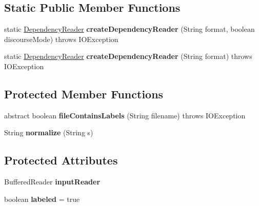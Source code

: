 \subsection*{Static Public Member Functions}
\begin{DoxyCompactItemize}
\item 
\hypertarget{classmstparser_1_1io_1_1DependencyReader_a1fcb7fe3a6edc5ae299700488477d660}{
static \hyperlink{classmstparser_1_1io_1_1DependencyReader}{DependencyReader} {\bfseries createDependencyReader} (String format, boolean discourseMode)  throws IOException }
\label{classmstparser_1_1io_1_1DependencyReader_a1fcb7fe3a6edc5ae299700488477d660}

\item 
\hypertarget{classmstparser_1_1io_1_1DependencyReader_ab5c02feda68bf1c768b4b97e42097873}{
static \hyperlink{classmstparser_1_1io_1_1DependencyReader}{DependencyReader} {\bfseries createDependencyReader} (String format)  throws IOException }
\label{classmstparser_1_1io_1_1DependencyReader_ab5c02feda68bf1c768b4b97e42097873}

\end{DoxyCompactItemize}
\subsection*{Protected Member Functions}
\begin{DoxyCompactItemize}
\item 
\hypertarget{classmstparser_1_1io_1_1DependencyReader_a948c0deb5940f2e25e7a3b2097cd4546}{
abstract boolean {\bfseries fileContainsLabels} (String filename)  throws IOException}
\label{classmstparser_1_1io_1_1DependencyReader_a948c0deb5940f2e25e7a3b2097cd4546}

\item 
\hypertarget{classmstparser_1_1io_1_1DependencyReader_a3238309398b641ce0634448e7197d8aa}{
String {\bfseries normalize} (String s)}
\label{classmstparser_1_1io_1_1DependencyReader_a3238309398b641ce0634448e7197d8aa}

\end{DoxyCompactItemize}
\subsection*{Protected Attributes}
\begin{DoxyCompactItemize}
\item 
\hypertarget{classmstparser_1_1io_1_1DependencyReader_a0b69bc5195ebb436a8a5f0c22deee407}{
BufferedReader {\bfseries inputReader}}
\label{classmstparser_1_1io_1_1DependencyReader_a0b69bc5195ebb436a8a5f0c22deee407}

\item 
\hypertarget{classmstparser_1_1io_1_1DependencyReader_a165e26aebb32954e41cfd6efa5cb6338}{
boolean {\bfseries labeled} = true}
\label{classmstparser_1_1io_1_1DependencyReader_a165e26aebb32954e41cfd6efa5cb6338}

\end{DoxyCompactItemize}


